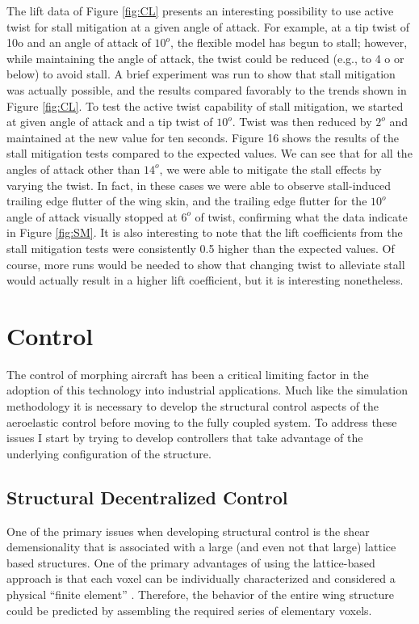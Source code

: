 \documentclass[11pt]{ucthesis}
\begin{document}
The lift data of Figure \ref{fig:CL} presents an interesting possibility to use active twist for stall mitigation at a given angle of attack. For example, at a tip twist of 10o and an angle of attack of $10^o$, the flexible model has begun to stall; however, while maintaining the angle of attack, the twist could be reduced (e.g., to 4 o or below) to avoid stall. A brief experiment was run to show that stall mitigation was actually possible, and the results compared favorably to the trends shown in Figure \ref{fig:CL}.
To test the active twist capability of stall mitigation, we started at given angle of attack and a tip twist of $10^o$. Twist was then reduced by $2^o$ and maintained at the new value for ten seconds. Figure 16 shows the results of the stall mitigation tests compared to the expected values. We can see that for all the angles of attack other than $14^o$, we were able to mitigate the stall effects by varying the twist. In fact, in these cases we were able to observe stall-induced trailing edge flutter of the wing skin, and the trailing edge flutter for the $10^o$ angle of attack visually stopped at $6^o$ of twist, confirming what the data indicate in Figure \ref{fig:SM}. It is also interesting to note that the lift coefficients from the stall mitigation tests were consistently 0.5 higher than the expected values. Of course, more runs would be needed to show that changing twist to alleviate stall would actually result in a higher lift coefficient, but it is interesting nonetheless.


\chapter{Control}
The control of morphing aircraft has been a critical limiting factor in the adoption of this technology into industrial applications. Much like the simulation methodology it is necessary to develop the structural control aspects of the aeroelastic control before moving to the fully coupled system. To address these issues I start by trying to develop controllers that take advantage of the underlying configuration of the structure.

\section{Structural Decentralized Control}
\label{sec:decentral}
One of the primary issues when developing structural control is the shear demensionality that is associated with a large (and even not that large) lattice based structures. One of the primary advantages of using the lattice-based approach is that each voxel can be individually characterized and considered a physical ``finite element'' \cite{calisch2014physical}. Therefore, the behavior of the entire wing structure could be predicted by assembling the required series of elementary voxels. 
\end{document}
